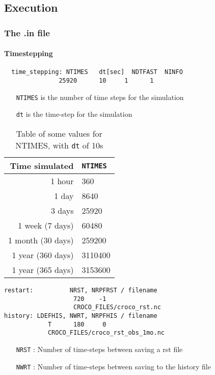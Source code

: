 \documentclass{article}
\begin{document}
\subsection{Execution}
\subsubsection{The .in file}
\paragraph{Timestepping}
\begin{lstlisting}
  time_stepping: NTIMES   dt[sec]  NDTFAST  NINFO
               25920      10     1      1
\end{lstlisting}
\begin{itemize}
  \item[\texttt{NTIMES}] is the number of time steps for the simulation
  \item[\texttt{dt}] is the time-step for the simulation 
\end{itemize}

\begin{table}[!h]
  \centering
  \begin{tabular}{rl} \hline
   Time simulated & \texttt{NTIMES} \\ \hline
    1 hour & 360 \\
    1 day & 8640 \\
    3 days & 25920 \\
    1 week (7 days)& 60480 \\
    1 month (30 days) & 259200 \\
    1 year (360 days) & 3110400 \\
    1 year (365 days) & 3153600 \\ \hline
  \end{tabular}
  \caption{Table of some values for NTIMES, with \texttt{dt} of 10s}
  \label{tab:NTIMESref}
\end{table}
\begin{lstlisting}
restart:          NRST, NRPFRST / filename
                   720    -1
                   CROCO_FILES/croco_rst.nc
history: LDEFHIS, NWRT, NRPFHIS / filename
            T      180     0
            CROCO_FILES/croco_rst_obs_1mo.nc
\end{lstlisting}
\begin{itemize}
\item[\texttt{NRST}]: Number of time-steps between saving a rst file
\item[\texttt{NWRT}]: Number of time-steps between saving to the history file 
\end{itemize}
\end{document}
